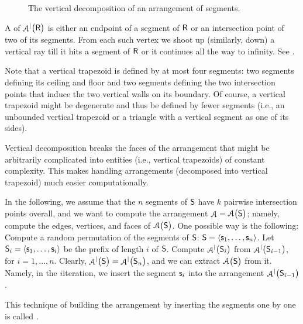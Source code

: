 \begin{figure}[t]
    \centering
    \caption{The vertical decomposition of an arrangement of segments.}
\end{figure}
A  of
$\ArrVD{\bigl.\Sample}$ is either an endpoint of a segment of
$\mathsf{R}$ or an intersection point of two of its segments. From each
such vertex we shoot up (similarly, down) a vertical ray till it hits
a segment of $\mathsf{R}$ or it continues all the way to infinity.  See
.

Note that a vertical trapezoid is defined by at most four segments:
two segments defining its ceiling and floor and two segments defining
the two intersection points that induce the two vertical walls on its
boundary. Of course, a vertical trapezoid might be degenerate and thus
be defined by fewer segments (i.e., an unbounded vertical trapezoid or
a triangle with a vertical segment as one of its sides).


Vertical decomposition breaks the faces of the arrangement that might
be arbitrarily complicated into entities (i.e., vertical trapezoids)
of constant complexity. This makes handling arrangements (decomposed
into vertical trapezoid) much easier computationally.


In the following, we assume that the $n$ segments of $\mathsf{S}$ have
$k$ pairwise intersection points overall, and we want to compute the
arrangement $\Arr = \ArrX{\bigl.\SegSet}$; namely, compute the edges,
vertices, and faces of $\ArrX{\bigl.\SegSet}$. One possible way is the
following: Compute a random permutation of the segments of $\mathsf{S}$:
$\mathsf{S} = \left\langle {\mathsf{s}_1, \ldots, \mathsf{s}_n} \right\rangle$. Let $\mathsf{S}_i =
\left\langle {\mathsf{s}_1,\ldots, \mathsf{s}_i} \right\rangle$ be the prefix of length $i$ of
$\mathsf{S}$. Compute $\ArrVD{\bigl.\SegSet_i}$ from
$\ArrVD{\bigl.\SegSet_{i-1}}$, for $i=1, \ldots, n$.  Clearly,
$\ArrVD{\bigl.\SegSet} = \ArrVD{\bigl.\SegSet_n}$, and we can extract
$\ArrX{\bigl.  \SegSet }$ from it. Namely, in the $i$\th iteration, we
insert the segment $\mathsf{s}_i$ into the arrangement
$\ArrVD{\bigl.\SegSet_{i-1}}$.

This technique of building the arrangement by inserting the segments
one by one is called .

